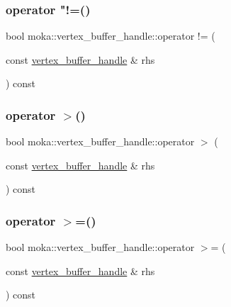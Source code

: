 \subsubsection{\texorpdfstring{operator "!=()}{operator !=()}}
{\footnotesize\ttfamily bool moka\+::vertex\+\_\+buffer\+\_\+handle\+::operator != (\begin{DoxyParamCaption}\item[{const \mbox{\hyperlink{structmoka_1_1vertex__buffer__handle}{vertex\+\_\+buffer\+\_\+handle}} \&}]{rhs }\end{DoxyParamCaption}) const}

\mbox{\label{structmoka_1_1vertex__buffer__handle_a307505fd7607a4cd1adf5ba29e7b3761}} 
\subsubsection{\texorpdfstring{operator $>$()}{operator >()}}
{\footnotesize\ttfamily bool moka\+::vertex\+\_\+buffer\+\_\+handle\+::operator $>$ (\begin{DoxyParamCaption}\item[{const \mbox{\hyperlink{structmoka_1_1vertex__buffer__handle}{vertex\+\_\+buffer\+\_\+handle}} \&}]{rhs }\end{DoxyParamCaption}) const}

\mbox{\label{structmoka_1_1vertex__buffer__handle_aee82c7fa26d06e56fd204b0ad57bccb6}} 
\subsubsection{\texorpdfstring{operator $>$=()}{operator >=()}}
{\footnotesize\ttfamily bool moka\+::vertex\+\_\+buffer\+\_\+handle\+::operator $>$= (\begin{DoxyParamCaption}\item[{const \mbox{\hyperlink{structmoka_1_1vertex__buffer__handle}{vertex\+\_\+buffer\+\_\+handle}} \&}]{rhs }\end{DoxyParamCaption}) const}

